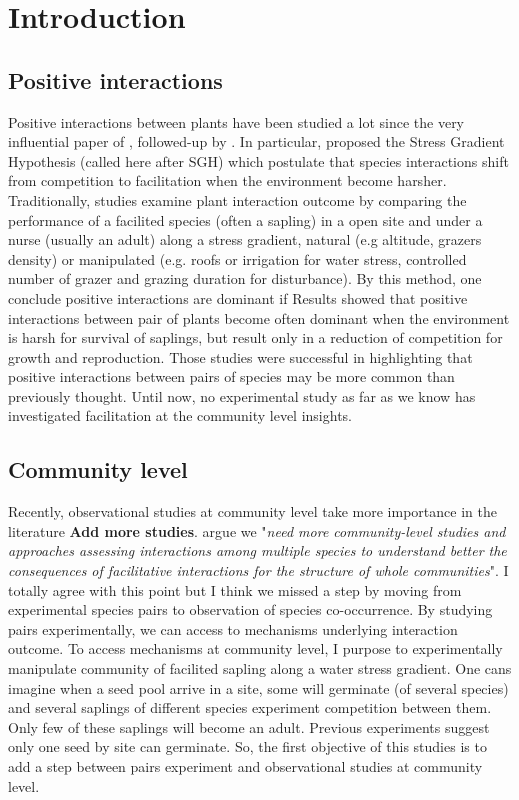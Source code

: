 \documentclass[12pt]{article} %
\begin{document}
\section{Introduction}

\subsection{Positive interactions}
Positive interactions between plants have been studied a lot since the very influential paper of \citep{Bertness1994}, followed-up by \citep{Bruno2003}. In particular, \citet{Bertness1994} proposed the Stress Gradient Hypothesis (called here after SGH) which postulate that species interactions shift from competition to facilitation when the environment become harsher. Traditionally, studies examine plant interaction outcome by comparing the performance of a facilited species (often a sapling) in a open site and under a nurse (usually an adult) along a stress gradient, natural (e.g altitude, grazers density) or manipulated (e.g. roofs or irrigation for water stress, controlled number of grazer and grazing duration for disturbance). By this method, one conclude positive interactions are dominant if  Results showed that positive interactions between pair of plants become often dominant when the environment is harsh for survival of saplings, but result only in a reduction of competition for growth and reproduction\citep{He2013}. Those studies were successful in highlighting that positive interactions between pairs of species may be more common than previously thought. Until now, no experimental study as far as we know has investigated facilitation at the community level insights. 

\subsection{Community level}
Recently, observational studies at community level take more importance in the literature \citep{Soliveres2012, Gross2013, Soliveres2014b} \textbf{Add more studies}. \citet{Soliveres2014} argue we "\textit{need more community-level studies and approaches assessing interactions among multiple species to understand better the consequences of facilitative interactions for the structure of whole communities}". I totally agree with this point but I think we missed a step by moving from experimental species pairs to observation of species co-occurrence. By studying pairs experimentally, we can access to mechanisms underlying interaction outcome. To access mechanisms at community level, I purpose to experimentally manipulate community of facilited sapling along a water stress gradient.
One cans imagine when a seed pool arrive in a site, some will germinate (of several species) and several saplings of different species experiment competition between them. Only few of these saplings will become an adult. Previous experiments suggest only one seed by site can germinate. So, the first objective of this studies is to add a step between pairs experiment and observational studies at community level.
\end{document}
